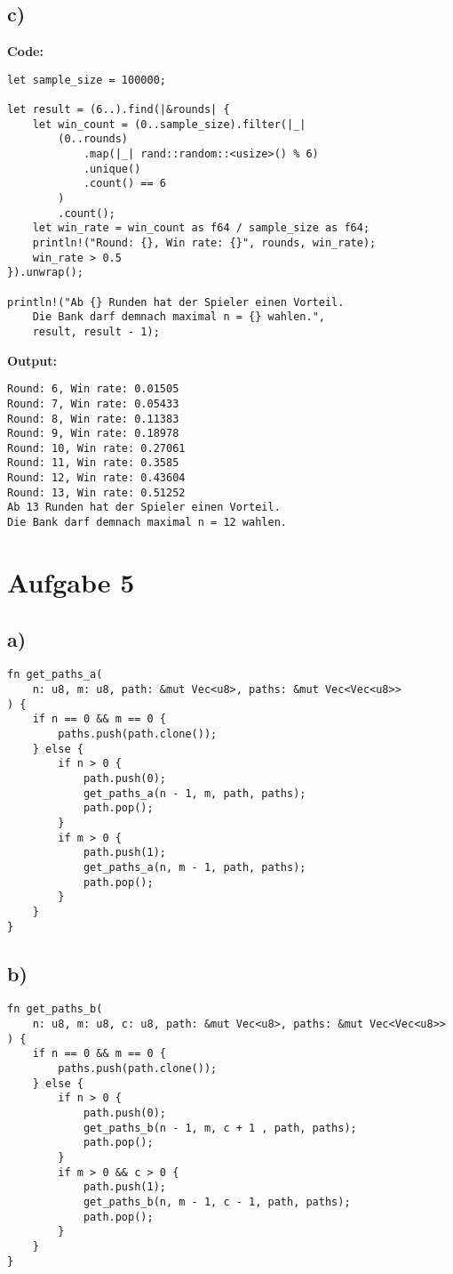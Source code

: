 \documentclass[a4paper]{scrartcl}
\begin{document}
\subsection*{c)}
\textbf{Code:}
\begin{lstlisting}
let sample_size = 100000;

let result = (6..).find(|&rounds| {
    let win_count = (0..sample_size).filter(|_| 
        (0..rounds)
            .map(|_| rand::random::<usize>() % 6)
            .unique()
            .count() == 6
        )
        .count();
    let win_rate = win_count as f64 / sample_size as f64;
    println!("Round: {}, Win rate: {}", rounds, win_rate);
    win_rate > 0.5
}).unwrap();

println!("Ab {} Runden hat der Spieler einen Vorteil. 
    Die Bank darf demnach maximal n = {} wahlen.", 
    result, result - 1);
\end{lstlisting}

\textbf{Output:}
\begin{lstlisting}
Round: 6, Win rate: 0.01505
Round: 7, Win rate: 0.05433
Round: 8, Win rate: 0.11383
Round: 9, Win rate: 0.18978
Round: 10, Win rate: 0.27061
Round: 11, Win rate: 0.3585
Round: 12, Win rate: 0.43604
Round: 13, Win rate: 0.51252
Ab 13 Runden hat der Spieler einen Vorteil. 
Die Bank darf demnach maximal n = 12 wahlen.
\end{lstlisting}

\section*{Aufgabe 5}
\subsection*{a)}
\begin{lstlisting}
fn get_paths_a(
    n: u8, m: u8, path: &mut Vec<u8>, paths: &mut Vec<Vec<u8>>
) {
    if n == 0 && m == 0 {
        paths.push(path.clone());
    } else {
        if n > 0 {
            path.push(0);
            get_paths_a(n - 1, m, path, paths);
            path.pop();
        }
        if m > 0 {
            path.push(1);
            get_paths_a(n, m - 1, path, paths);
            path.pop();
        }
    }
}
\end{lstlisting}

\subsection*{b)}
\begin{lstlisting}
fn get_paths_b(
    n: u8, m: u8, c: u8, path: &mut Vec<u8>, paths: &mut Vec<Vec<u8>>
) {
    if n == 0 && m == 0 {
        paths.push(path.clone());
    } else {
        if n > 0 {
            path.push(0);
            get_paths_b(n - 1, m, c + 1 , path, paths);
            path.pop();
        }
        if m > 0 && c > 0 {
            path.push(1);
            get_paths_b(n, m - 1, c - 1, path, paths);
            path.pop();
        }
    }
}
\end{lstlisting}    
\end{document}

